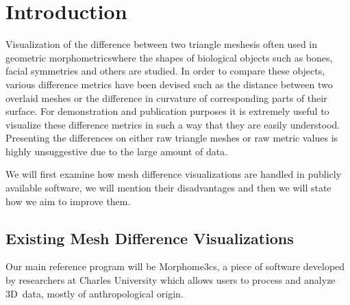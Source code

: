 \chapter*{Introduction}

Visualization of the difference between two triangle meshes\footnotemark is often used in geometric morphometrics\footnotemark where the shapes of biological objects such as bones, facial symmetries and others are studied. In order to compare these objects, various difference metrics have been devised such as the distance between two overlaid meshes or the difference in curvature of corresponding parts of their surface. For demonstration and publication purposes it is extremely useful to visualize these difference metrics in such a way that they are easily understood. Presenting the differences on either raw triangle meshes or raw metric values is highly unsuggestive due to the large amount of data\footnotemark.

\addtocounter{footnote}{-3}

We will first examine how mesh difference visualizations are handled in publicly available software, we will mention their disadvantages and then we will state how we aim to improve them.

\section*{Existing Mesh Difference Visualizations}
\label{sec:existing_visualizations}

Our main reference program will be Morphome3cs\footnotemark, a piece of software developed by researchers at Charles University which allows users to process and analyze 3D~data, mostly of anthropological origin.



